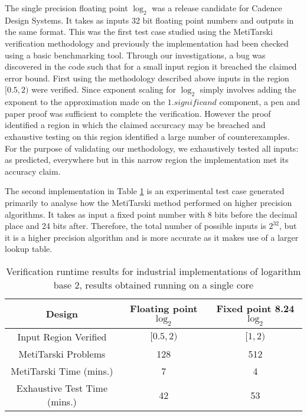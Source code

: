 \documentclass[a4paper]{article}
\begin{document}
The single precision floating point $\log_2$ was a release candidate for Cadence Design Systems. It takes as inputs 32 bit floating point numbers and outputs in the same format. This was the first test case studied using the MetiTarski verification methodology and previously the implementation had been checked using a basic benchmarking tool. Through our investigations, a bug was discovered in the code such that for a small input region it breached the claimed error bound. First using the methodology described above inputs in the region $[0.5,2)$ were verified. Since exponent scaling for $\log_2$ simply involves adding the exponent to the approximation made on the $1.\textit{significand}$ component, a pen and paper proof was sufficient to complete the verification. However the proof identified a region in which the  claimed accurcacy may be breached and exhaustive testing on this region identified a large number of counterexamples. For the purpose of validating our methodology, we exhaustively tested all inputs: as predicted, everywhere but in this narrow region the implementation met its accuracy claim.

The second implementation in Table \ref{result} is an experimental test case generated primarily to analyse how the MetiTarski method performed on higher precision algorithms. It takes as input a fixed point number with 8 bits before the decimal place and 24 bits after. Therefore, the total number of possible inputs is $2^{32}$, but it is a higher precision algorithm and is more accurate as it makes use of a larger lookup table.

\begin{center}
\begin{table}[h!]
\centering
\begin{tabular}{ccc} 
\toprule
 Design & Floating point $\log_2$ & Fixed point 8.24 $\log_2$    \\
\midrule
 Input Region Verified& $[0.5,2)$ & $[1,2) $ \\ 
 MetiTarski Problems & 128 & 512 \\
 MetiTarski Time (mins.) &  7 & 4 \\ 
 Exhaustive Test Time (mins.) & 42 & 53 \\ 
\bottomrule
\end{tabular}
\caption{Verification runtime results for industrial implementations of logarithm base 2, results obtained running on a single core}
\label{result}
\end{table}
\end{center}
\end{document}

